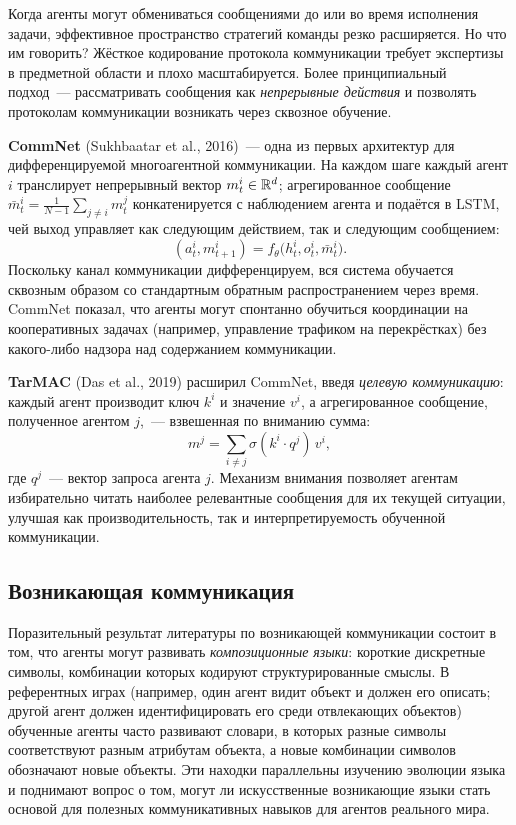 Когда агенты могут обмениваться сообщениями до или во время исполнения задачи,
эффективное пространство стратегий команды резко расширяется. Но
что им говорить? Жёсткое кодирование протокола коммуникации требует
экспертизы в предметной области и плохо масштабируется. Более принципиальный подход~---
рассматривать сообщения как \emph{непрерывные действия} и позволять протоколам коммуникации
возникать через сквозное обучение.

\textbf{CommNet} (Sukhbaatar et al., 2016)~---
одна из первых архитектур для дифференцируемой многоагентной
коммуникации. На каждом шаге каждый агент $i$ транслирует
непрерывный вектор $m^i_t \in \mathbb{R}^d$; агрегированное сообщение
$\bar{m}^i_t = \frac{1}{N-1}\sum_{j \neq i} m^j_t$ конкатенируется
с наблюдением агента и подаётся в LSTM, чей
выход управляет как следующим действием, так и следующим сообщением:
\[
  (a^i_t, m^i_{t+1}) = f_\theta\!\bigl(h^i_t, o^i_t, \bar{m}^i_t\bigr).
\]
Поскольку канал коммуникации дифференцируем, вся
система обучается сквозным образом со стандартным обратным распространением через
время. CommNet показал, что агенты могут спонтанно обучиться
координации на кооперативных задачах (например, управление трафиком на перекрёстках)
без какого-либо надзора над содержанием коммуникации.

\textbf{TarMAC} (Das et al., 2019) расширил
CommNet, введя \emph{целевую коммуникацию}: каждый агент
производит ключ $k^i$ и значение $v^i$, а агрегированное сообщение,
полученное агентом $j$,~--- взвешенная по вниманию сумма:
\[
  m^j = \sum_{i \neq j} \sigma(k^i \cdot q^j)\, v^i,
\]
где $q^j$~--- вектор запроса агента $j$. Механизм внимания
позволяет агентам избирательно читать наиболее релевантные сообщения для их
текущей ситуации, улучшая как производительность, так и
интерпретируемость обученной коммуникации.

\subsection{Возникающая коммуникация}

Поразительный результат литературы по возникающей коммуникации состоит в том, что
агенты могут развивать \emph{композиционные языки}: короткие дискретные символы, комбинации которых
кодируют структурированные смыслы. В референтных играх
(например, один агент видит объект и должен его описать; другой агент
должен идентифицировать его среди отвлекающих объектов) обученные агенты часто развивают
словари, в которых разные символы соответствуют разным атрибутам объекта,
а новые комбинации символов обозначают новые объекты.
Эти находки параллельны изучению эволюции языка и поднимают
вопрос о том, могут ли искусственные возникающие языки стать основой
для полезных коммуникативных навыков для агентов реального мира.

